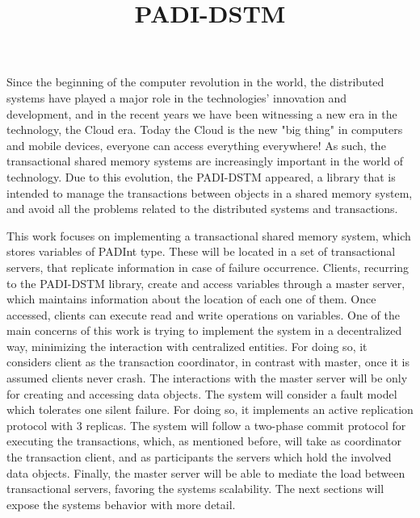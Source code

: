 \documentclass[times, 10pt,twocolumn]{article}
\begin{document}
\title{PADI-DSTM}



\maketitle
\thispagestyle{empty}


Since the beginning of the computer revolution in the world, the distributed systems have played a major role in the technologies' innovation and development, and in the recent years we have been witnessing a new era in the technology, the Cloud era. Today the Cloud is the new "big thing" in computers and mobile devices, everyone can access everything  everywhere! As such, the transactional shared memory systems are increasingly important in the world of technology. Due to this evolution, the PADI-DSTM appeared, a library that is intended to manage the transactions between objects in a shared memory system, and avoid all the problems related to the distributed systems and transactions.


This work focuses on implementing a transactional shared memory system, which stores variables of PADInt type. These will be located in a set of transactional servers, that replicate information in case of failure occurrence. Clients, recurring to the PADI-DSTM library, create and access variables through a master server, which maintains information about the location of each one of them. Once accessed, clients can execute read and write operations on variables. One of the main concerns of this work is trying to implement the system in a decentralized way, minimizing the interaction with centralized entities. For doing so, it considers client as the transaction coordinator, in contrast with master, once it is assumed clients never crash. The interactions with the master server will be only for creating and accessing data objects. The system will consider a fault model which tolerates one silent failure. For doing so, it implements an active replication protocol with 3 replicas. The system will follow a two-phase commit protocol for executing the transactions, which, as mentioned before, will take as coordinator the transaction client, and as participants the servers which hold the involved data objects. Finally, the master server will be able to mediate the load between transactional servers, favoring the systems scalability. The next sections will expose the systems behavior with more detail.  
\end{document}
